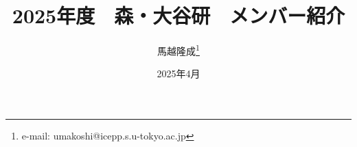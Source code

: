 \title{2025年度　森・大谷研　メンバー紹介}
\date{2025年4月} %
\author{馬越隆成\footnote{e-mail: umakoshi@icepp.s.u-tokyo.ac.jp}} %
\seifuku{} %
